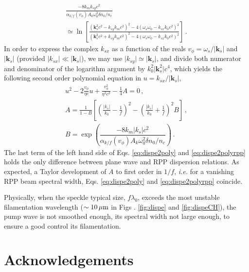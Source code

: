 \documentclass[
 reprint,
 amsmath,amssymb,
 aps,
]{revtex4-1}
\begin{document}
\begin{align}
 \frac{-8k_mk_{sy}c^2}{\alpha_{k/f}(v_\phi)A_k \omega_0^2\delta n_0/n_c  } \nonumber\\
 \simeq  \ln\left[
 \frac{ (\mathbf{k}_s^2c^2-k_{sy} k_m c^2)^2 -4(\omega_s\omega_0 - k_{sx}k_0 c^2)^2}{ (\mathbf{k}_s^2c^2+k_{sy} k_m c^2)^2 -4(\omega_s\omega_0 - k_{sx}k_0 c^2)^2} \right] \, .\label{eq:disperpp2} 
\end{align}
In order to express the complex $k_{sx}$ as a function of the reals $v_\phi=\omega_s/\vert \mathbf{k}_s\vert $ and $\vert \mathbf{k}_s\vert $ (provided  $\vert k_{sx}\vert \ll \vert \mathbf{k}_s\vert$), we may use $\vert k_{sy} \vert  \simeq \vert \mathbf{k}_s\vert$, and divide both numerator and denominator of the logarithm argument by $k_0^2\vert \mathbf{k}_s^2\vert c^4$, which yields the following second order polynomial equation in $u =  k_{sx}/\vert \mathbf{k}_s\vert$,
\begin{align}
u^2 -2\frac{v_\phi}{\eta c}u +\frac{v_\phi^2}{\eta^2 c^2}-\frac{1}{4}A =0 
\, , \nonumber\\
A= \frac{1}{1-B}\left[ \left(\frac{\vert k_{s}\vert}{k_0}-\frac{1}{f}\right)^2-\left(\frac{\vert k_{s}\vert}{k_0}+\frac{1}{f}\right)^2B  \right]\, , \nonumber \\ 
B =\exp\left(\dfrac{-8k_m \vert k_{s}\vert c^2}{\alpha_{k/f}(v_\phi)A_k \omega_0^2\delta n_0/n_c  }\right)\, . \label{eq:dispe2polyrpp} 
\end{align}
The last term of the left hand side of  Eqs. \eqref{eq:dispe2poly} and \eqref{eq:dispe2polyrpp} holds the only difference between plane wave and RPP dispersion relations. 
As expected, a Taylor development of $A$ to first order in $1/f$, \emph{i.e.} for a vanishing  RPP beam spectral width, Eqs.  \eqref{eq:dispe2poly} and \eqref{eq:dispe2polyrpp} co\"incide. 

Physically, when the speckle typical size, $f\lambda_0$, exceeds the most unstable filamentation wavelength ($\sim 10 \,\rm\mu m$ in Figs . \ref{fig:dispe} and  \ref{fig:dispeCH}), the pump wave is not smoothed enough, its spectral width not large enough, to ensure a good control its filamentation. 

\section*{Acknowledgements}

\end{document}
